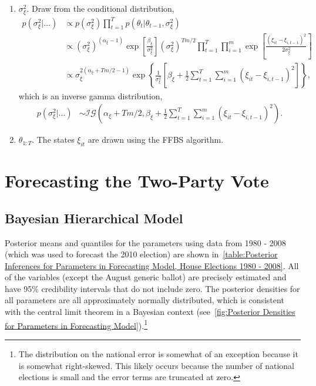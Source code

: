 \documentclass[12pt,final,fleqn]{article}
\theoremstyle{plain}
\begin{document}
\begin{enumerate}
\item $\sigma_\xi^2$. Draw from the conditional distribution,
\begin{align}
p(\sigma_\xi^2|\ldots)&\propto p(\sigma_\xi^2) \prod_{t=1}^T p(\theta_{t}|\theta_{t-1}, \sigma_\xi^2) \\
&\propto (\sigma_\xi^2)^{(\alpha_\xi - 1)}\exp\left[\frac{\beta_\xi}{\sigma_\xi^2}\right](\sigma_\xi^2)^{Tm/2} \prod_{t=1}^T \prod_{i=1}^m \exp\left[\frac{(\xi_{it} - \xi_{i,t-1})^2}{2\sigma_\xi^2}\right]\\
&\propto \sigma_\xi^{2(\alpha_\xi + Tm/2 - 1)}\exp\left\{\frac{1}{\sigma_\xi^2}\left[\beta_\xi + \frac{1}{2}\sum_{t=1}^T \sum_{i=1}^m (\xi_{it} - \xi_{i,t-1})^2\right]\right\},
\end{align}
which is an inverse gamma distribution,
\begin{align}
p(\sigma_\xi^2|\ldots)&\sim \mathcal{IG}\left(\alpha_\xi + Tm/2, \beta_\xi + \frac{1}{2}\sum_{t=1}^T \sum_{i=1}^m (\xi_{it} - \xi_{i,t-1})^2  \right).
\end{align}
\item $\theta_{1:T}$. The states $\xi_{it}$ are drawn using the FFBS algorithm.
\end{enumerate}

\section{Forecasting the Two-Party Vote}
\subsection{Bayesian Hierarchical Model}\label{sec:forecast_hierarchical}
Posterior means and quantiles for the parameters using data from 1980 - 2008 (which was used to forecast the 2010 election) are shown in~\autoref{table:Posterior Inferences for Parameters in Forecasting Model, House Elections 1980 - 2008}. All of the variables (except the August generic ballot) are precisely estimated and have 95\% credibility intervals that do not include zero. The posterior densities for all parameters are all approximately normally distributed,  which is consistent with the central limit theorem in a Bayesian context (see~\autoref{fig:Posterior Densities for Parameters in Forecasting Model}).\footnote{The distribution on the national error is somewhat of an exception because it is somewhat right-skewed. This likely occurs because the number of national elections is small and the error terms are truncated at zero.}
\end{document}
